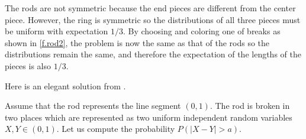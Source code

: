 
The rods are not symmetric because the end pieces are different from the center piece. However, the ring is symmetric so the distributions of all three pieces must be uniform with expectation $1/3$. By choosing and coloring one of breaks as shown in \ref{f.rod2}, the problem is now the same as that of the rods so the distributions remain the same, and therefore the expectation of the lengths of the pieces is also $1/3$.


Here is an elegant solution from \cite{stack-rods}.

Assume that the rod represents the line segment $(0,1)$. The rod is broken in two places which are represented as two uniform independent random variables $X,Y\in (0,1)$. Let us compute the probability $P(|X-Y|>a)$.

